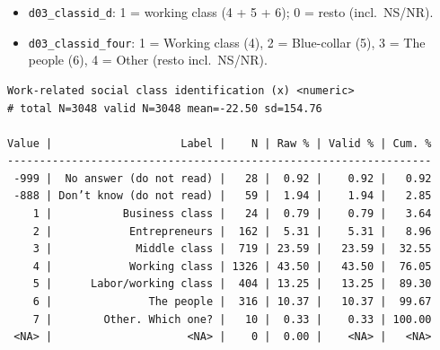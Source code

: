 \documentclass[
  letterpaper,
  DIV=11,
  numbers=noendperiod]{scrreprt}
\newenvironment{Shaded}{\begin{snugshade}}{\end{snugshade}}
\newcommand{\FunctionTok}[1]{\textcolor[rgb]{0.28,0.35,0.67}{#1}}
\newcommand{\NormalTok}[1]{\textcolor[rgb]{0.00,0.23,0.31}{#1}}
\newcommand{\SpecialCharTok}[1]{\textcolor[rgb]{0.37,0.37,0.37}{#1}}
\providecommand{\tightlist}{%
  \setlength{\itemsep}{0pt}\setlength{\parskip}{0pt}}
\begin{document}
\begin{itemize}
\tightlist
\item
  \texttt{d03\_classid\_d}: 1 = working class (4 + 5 + 6); 0 = resto
  (incl.~NS/NR).
\item
  \texttt{d03\_classid\_four}: 1 = Working class (4), 2 = Blue-collar
  (5), 3 = The people (6), 4 = Other (resto incl.~NS/NR).
\end{itemize}

\begin{Shaded}
\end{Shaded}

\begin{verbatim}
Work-related social class identification (x) <numeric> 
# total N=3048 valid N=3048 mean=-22.50 sd=154.76

Value |                    Label |    N | Raw % | Valid % | Cum. %
------------------------------------------------------------------
 -999 |  No answer (do not read) |   28 |  0.92 |    0.92 |   0.92
 -888 | Don’t know (do not read) |   59 |  1.94 |    1.94 |   2.85
    1 |           Business class |   24 |  0.79 |    0.79 |   3.64
    2 |            Entrepreneurs |  162 |  5.31 |    5.31 |   8.96
    3 |             Middle class |  719 | 23.59 |   23.59 |  32.55
    4 |            Working class | 1326 | 43.50 |   43.50 |  76.05
    5 |      Labor/working class |  404 | 13.25 |   13.25 |  89.30
    6 |               The people |  316 | 10.37 |   10.37 |  99.67
    7 |        Other. Which one? |   10 |  0.33 |    0.33 | 100.00
 <NA> |                     <NA> |    0 |  0.00 |    <NA> |   <NA>
\end{verbatim}
\end{document}
